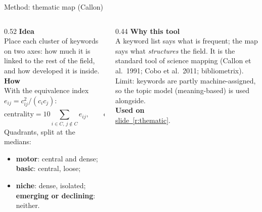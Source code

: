 \documentclass[aspectratio=169,10pt]{beamer}
\newcommand{\usedon}[1]{\hyperref[#1]{\textcolor{c4}{slide~\ref*{#1}}}}
\newcommand{\mhead}[1]{\textcolor{c1}{\textbf{#1}}\\[1pt]}
\begin{document}
\begin{frame}{Method: thematic map (Callon)}
\begin{columns}[T]
\begin{column}{0.52\textwidth}\footnotesize
\mhead{Idea}
Place each cluster of keywords on two axes: how much it is linked to the rest of the field, and how developed it is inside.\\[4pt]
\mhead{How}
With the equivalence index $e_{ij} = c_{ij}^2 / (c_i c_j)$:
\[ \text{centrality} = 10\!\!\sum_{i\in C,\,j\notin C}\!\! e_{ij}, \qquad \text{density} = \frac{100}{|C|}\!\sum_{i,j\in C}\! e_{ij} \]
Quadrants, split at the medians:
\begin{itemize}\setlength\itemsep{0pt}
\item \textbf{motor}: central and dense; \textbf{basic}: central, loose;
\item \textbf{niche}: dense, isolated; \textbf{emerging or declining}: neither.
\end{itemize}
\end{column}
\begin{column}{0.44\textwidth}\footnotesize
\mhead{Why this tool}
A keyword list says what is frequent; the map says what \emph{structures} the field. It is the standard tool of science mapping (Callon et al.\ 1991; Cobo et al.\ 2011; bibliometrix).\\[3pt]
Limit: keywords are partly machine-assigned, so the topic model (meaning-based) is used alongside.\\[6pt]
\mhead{Used on}
\usedon{r:thematic}.
\end{column}
\end{columns}
\end{frame}
\end{document}
